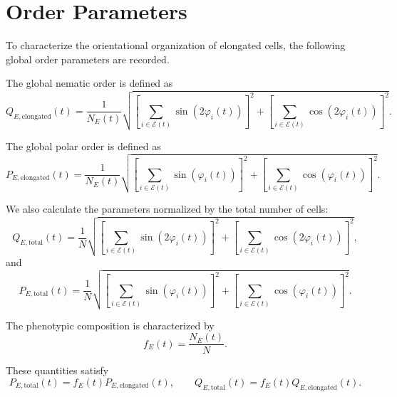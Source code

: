 \section{Order Parameters}

To characterize the orientational organization of elongated cells, the following global order parameters are recorded.

The global nematic order is defined as
\begin{equation}
    Q_{E,\mathrm{elongated}}(t)
    =
    \frac{1}{N_E(t)}
    \sqrt{
        \left[
            \sum_{i\in\mathcal{E}(t)}
            \sin\left(2\varphi_i(t)\right)
        \right]^2
        +
        \left[
            \sum_{i\in\mathcal{E}(t)}
            \cos\left(2\varphi_i(t)\right)
        \right]^2
    }.
\end{equation}

The global polar order is defined as
\begin{equation}
    P_{E,\mathrm{elongated}}(t)
    =
    \frac{1}{N_E(t)}
    \sqrt{
        \left[
            \sum_{i\in\mathcal{E}(t)}
            \sin\left(\varphi_i(t)\right)
        \right]^2
        +
        \left[
            \sum_{i\in\mathcal{E}(t)}
            \cos\left(\varphi_i(t)\right)
        \right]^2
    }.
\end{equation}

We also calculate the parameters normalized by the total number of cells:
\begin{equation}
    Q_{E,\mathrm{total}}(t)
    =
    \frac{1}{N}
    \sqrt{
        \left[
            \sum_{i\in\mathcal{E}(t)}
            \sin\left(2\varphi_i(t)\right)
        \right]^2
        +
        \left[
            \sum_{i\in\mathcal{E}(t)}
            \cos\left(2\varphi_i(t)\right)
        \right]^2
    },
\end{equation}
and
\begin{equation}
    P_{E,\mathrm{total}}(t)
    =
    \frac{1}{N}
    \sqrt{
        \left[
            \sum_{i\in\mathcal{E}(t)}
            \sin\left(\varphi_i(t)\right)
        \right]^2
        +
        \left[
            \sum_{i\in\mathcal{E}(t)}
            \cos\left(\varphi_i(t)\right)
        \right]^2
    }.
\end{equation}

The phenotypic composition is characterized by
\begin{equation}
    f_E(t)
    =
    \frac{N_E(t)}{N}.
\end{equation}

These quantities satisfy
\begin{equation}
    P_{E,\mathrm{total}}(t)
    =
    f_E(t)P_{E,\mathrm{elongated}}(t),
    \qquad
    Q_{E,\mathrm{total}}(t)
    =
    f_E(t)Q_{E,\mathrm{elongated}}(t).
\end{equation}

